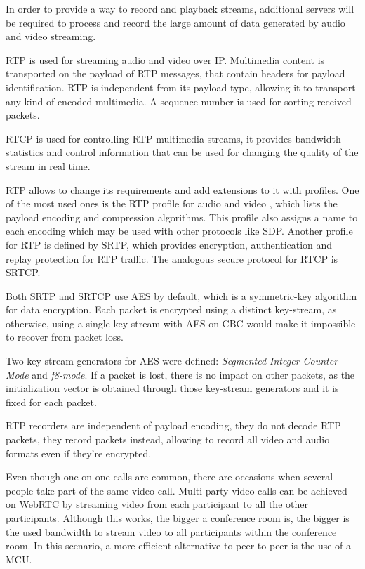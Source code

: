 \documentclass[10pt,conference]{IEEEtran}
\begin{document}
 	In order to provide a way to record and playback streams, additional servers will be required to process and record the large amount of data generated by audio and video streaming.

 \gls{RTP}\cite{rfc3550} is used for streaming audio and video over \gls{IP}.
 Multimedia content is transported on the payload of \gls{RTP} messages, that contain headers for payload identification. \gls{RTP} is independent from its payload type, allowing it to transport any kind of encoded multimedia. A sequence number is used for sorting received packets.

\gls{RTCP} is used for controlling \gls{RTP} multimedia streams, it provides bandwidth statistics and control information that can be used for changing the quality of the stream in real time.

  \gls{RTP} allows to change its requirements and add extensions to it with profiles. One of the most used ones is the \gls{RTP} profile for audio and video \cite{rfc3551}, which lists the payload encoding and compression algorithms. This profile also assigns a name to each encoding which may be used with other protocols like \gls{SDP}.
  Another profile for \gls{RTP} is defined by \gls{SRTP}, which provides encryption, authentication and replay protection for \gls {RTP} traffic. The analogous secure protocol for \gls{RTCP} is \gls{SRTCP}.

  Both \gls{SRTP} and \gls{SRTCP} use \gls{AES} by default, which is a symmetric-key algorithm for data encryption. Each packet is encrypted using a distinct key-stream, as otherwise, using a single key-stream with \gls{AES} on \gls{CBC} would make it impossible to recover from packet loss.

  Two key-stream generators for \gls{AES} were defined: \emph{Segmented Integer Counter Mode} and \emph{f8-mode}. If a packet is lost, there is no impact on other packets, as the initialization vector is obtained through those key-stream generators and it is fixed for each packet.


  \gls{RTP} recorders are independent of payload encoding, they do not decode \gls{RTP} packets, they record packets instead, allowing to record all video and audio formats even if they're encrypted.

        Even though one on one calls are common, there are occasions when several people take part of the same video call.
	Multi-party video calls can be achieved on \gls{WebRTC} by streaming video from each participant to all the other participants. Although this works, the bigger a conference room is, the bigger is the used bandwidth to stream video to all participants within the conference room.
        In this scenario, a more efficient alternative to peer-to-peer is the use of a \gls{MCU}.
\end{document}
